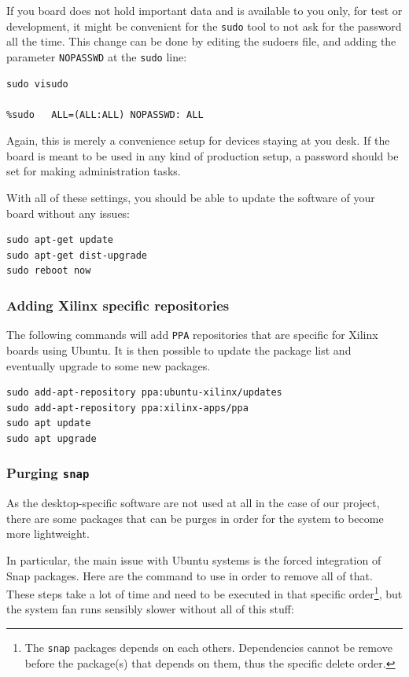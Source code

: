 \documentclass[10pt]{article}
\begin{document}
If you board does not hold important data
and is available to you only, for test or development,
it might be convenient for the \texttt{sudo} tool to not ask for the
password all the time.
This change can be done by editing the sudoers file, and
adding the parameter \texttt{NOPASSWD}
at the \texttt{sudo} line:

\begin{verbatim}
sudo visudo

%sudo   ALL=(ALL:ALL) NOPASSWD: ALL
\end{verbatim}

Again, this is merely a convenience setup for devices staying at you desk. If
the board is meant to be used in any kind of production setup, a password
should be set for making administration tasks.

With all of these settings, you should be able to update the software of your
board without any issues:
\begin{verbatim}
sudo apt-get update
sudo apt-get dist-upgrade
sudo reboot now
\end{verbatim}

\subsubsection{Adding Xilinx specific repositories}
\label{sec:org6fe4a4d}
The following commands will add \texttt{PPA} repositories that are specific for Xilinx boards using Ubuntu.
It is then possible to update the package list and eventually upgrade to some new packages.
\begin{verbatim}
sudo add-apt-repository ppa:ubuntu-xilinx/updates
sudo add-apt-repository ppa:xilinx-apps/ppa
sudo apt update
sudo apt upgrade
\end{verbatim}

\subsubsection{Purging \texttt{snap}}
\label{sec:org008a1ad}
As the desktop-specific software are not used at all in the case
of our project, there are some packages that can be purges in order for the
system to become more lightweight.

In particular, the main issue with Ubuntu systems is the forced integration of
Snap packages. Here are the command to use in order to remove all of that.
These steps take a lot of time and need to be executed in that specific order\footnote{The \texttt{snap} packages depends on each others. Dependencies
cannot be remove before the package(s) that depends on them,
thus the specific delete order.},
but the system fan runs sensibly slower without all of this stuff:
\end{document}
